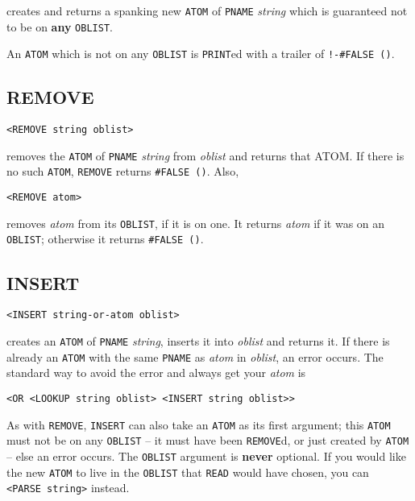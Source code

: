 \documentclass[a4paper]{scrbook}
\begin{document}
 creates and returns a spanking new \texttt{ATOM} of \texttt{PNAME} \emph{string} which is
guaranteed not to be on \textbf{any} \texttt{OBLIST}.

An \texttt{ATOM} which is not on any \texttt{OBLIST} is \texttt{PRINT}ed with a trailer of \texttt{!-\#FALSE\ ()}.

\subsection{REMOVE}\label{remove}

\begin{verbatim}
<REMOVE string oblist>
\end{verbatim}

 removes the \texttt{ATOM} of \texttt{PNAME} \emph{string} from \emph{oblist} and returns
that ATOM. If there is no such \texttt{ATOM}, \texttt{REMOVE} returns \texttt{\#FALSE\ ()}. Also,

\begin{verbatim}
<REMOVE atom>
\end{verbatim}

removes \emph{atom} from its \texttt{OBLIST}, if it is on one. It returns \emph{atom} if it was on an \texttt{OBLIST};
otherwise it returns \texttt{\#FALSE\ ()}.

\subsection{INSERT}\label{insert}

\begin{verbatim}
<INSERT string-or-atom oblist>
\end{verbatim}

 creates an \texttt{ATOM} of \texttt{PNAME} \emph{string}, inserts it into \emph{oblist} and
returns it. If there is already an \texttt{ATOM} with the same \texttt{PNAME} as \emph{atom} in \emph{oblist}, an error
occurs. The standard way to avoid the error and always get your \emph{atom} is

\begin{verbatim}
<OR <LOOKUP string oblist> <INSERT string oblist>>
\end{verbatim}

As with \texttt{REMOVE}, \texttt{INSERT} can also take an \texttt{ATOM} as its first argument; this \texttt{ATOM} must not
be on any \texttt{OBLIST} -- it must have been \texttt{REMOVE}d, or just created by \texttt{ATOM} -- else an error occurs.
The \texttt{OBLIST} argument is \textbf{never} optional. If you would like the new \texttt{ATOM} to live in the
\texttt{OBLIST} that \texttt{READ} would have chosen, you can \texttt{\textless{}PARSE\ string\textgreater{}} instead.
\end{document}
